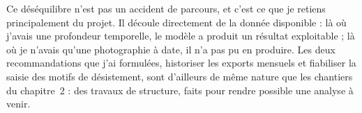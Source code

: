 Ce déséquilibre n'est pas un accident de parcours, et c'est ce que je retiens principalement du
projet. Il découle directement de la donnée disponible : là où j'avais une profondeur
temporelle, le modèle a produit un résultat exploitable ; là où je n'avais qu'une photographie à
date, il n'a pas pu en produire. Les deux recommandations que j'ai formulées, historiser les
exports mensuels et fiabiliser la saisie des motifs de désistement, sont d'ailleurs de même
nature que les chantiers du chapitre~2 : des travaux de structure, faits pour rendre possible
une analyse à venir.
